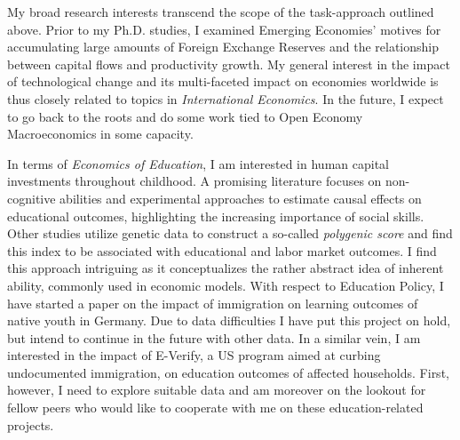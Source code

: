 \documentclass[a4paper,11pt]{article}
\begin{document}
	
	My broad research interests transcend the scope of the task-approach outlined above. Prior to my Ph.D. studies, I examined Emerging Economies' motives for accumulating large amounts of Foreign Exchange Reserves and the relationship between capital flows and productivity growth. My general interest in the impact of technological change and its multi-faceted impact on economies worldwide is thus closely related to topics in \textit{International Economics}. In the future, I expect to go back to the roots and do some work tied to Open Economy Macroeconomics in some capacity. 
	
	In terms of \textit{Economics of Education}, I am interested in human capital investments throughout childhood. A promising literature focuses on non-cognitive abilities and experimental approaches to estimate causal effects on educational outcomes, highlighting the increasing importance of social skills. Other studies utilize genetic data to construct a so-called \textit{polygenic score} and find this index to be associated with educational and labor market outcomes. I find this approach intriguing as it conceptualizes the rather abstract idea of inherent ability, commonly used in economic models. With respect to Education Policy, I have started a paper on the impact of immigration on learning outcomes of native youth in Germany. Due to data difficulties I have put this project on hold, but intend to continue in the future with other data. In a similar vein, I am interested in the impact of E-Verify, a US program aimed at curbing undocumented immigration, on education outcomes of affected households. First, however, I need to explore suitable data and am moreover on the lookout for fellow peers who would like to cooperate with me on these education-related projects. 
	
\end{document}
